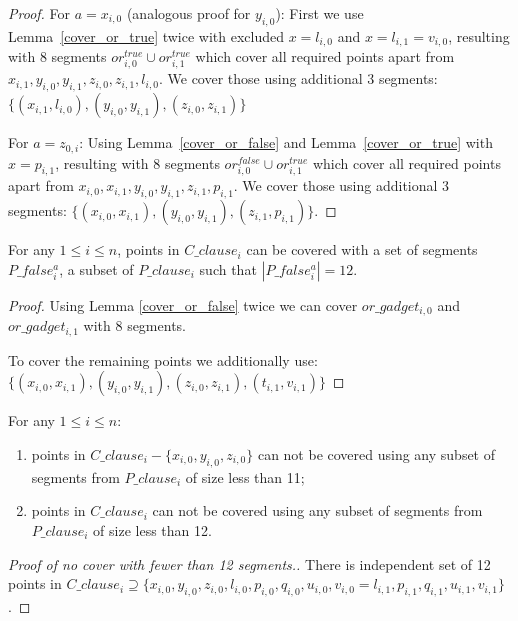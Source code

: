 \begin{proof}
For $a = x_{i, 0}$ (analogous proof for $y_{i, 0}$):
First we use Lemma~\ref{cover_or_true} twice with excluded $x = l_{i, 0}$ and
$x = l_{i, 1} = v_{i, 0}$,
resulting with 8 segments $or^{true}_{i, 0} \cup or^{true}_{i, 1}$
which cover all required points apart from
$x_{i, 1}, y_{i, 0}, y_{i, 1}, z_{i, 0}, z_{i, 1}, l_{i, 0}$.
We cover those using additional 3 segments:
$\{ (x_{i, 1}, l_{i, 0}), (y_{i, 0}, y_{i, 1}),
(z_{i, 0}, z_{i, 1}) \}$

For $a = z_{0, i}$:
Using Lemma~\ref{cover_or_false} and Lemma~\ref{cover_or_true} with
$x = p_{i, 1}$,
resulting with 8 segments $or^{false}_{i, 0} \cup or^{true}_{i, 1}$
which cover all required points apart from
$x_{i, 0}, x_{i, 1}, y_{i, 0}, y_{i, 1}, z_{i, 1}, p_{i, 1}$.
We cover those using additional 3 segments:
$\{ (x_{i, 0}, x_{i, 1}), (y_{i, 0}, y_{i, 1}),
(z_{i, 1}, p_{i, 1}) \}$.
\end{proof}

\begin{lemma}
\label{cover_clauses_solution_false}
For any $1 \le i \le n$,
points in $C\_clause_i$ can be covered with
a set of segments $P\_false^a_i$, a subset of $P\_clause_i$
such that $|P\_false^a_i| = 12$.
\end{lemma}

\begin{proof}
Using Lemma \ref{cover_or_false} twice we can
cover $or\_gadget_{i,0}$ and  $or\_gadget_{i,1}$
with 8 segments.

To cover the remaining points we additionally use:
$\{ (x_{i, 0}, x_{i, 1}), (y_{i, 0}, y_{i, 1}),
(z_{i, 0}, z_{i, 1}), (t_{i, 1}, v_{i, 1}) \}$
\end{proof}

\begin{lemma}
\label{cover_clauses_segments_no_less}
For any $1 \le i \le n$:
\begin{enumerate}[label={(\arabic*)}]
	\item points in $C\_clause_i - \{ x_{i, 0}, y_{i, 0}, z_{i, 0}\}$
	can not be covered using any subset of segments from $P\_clause_i$ of size less than 11;
	\item points in $C\_clause_i$ can not be covered 
	using any subset of segments from $P\_clause_i$ of size less than 12.
\end{enumerate}
\end{lemma}


\begin{proof}[Proof of no cover with fewer than 12 segments.]
There is independent set of 12 points in $C\_clause_i \supseteq
\{ x_{i, 0}, y_{i, 0}, z_{i, 0}, l_{i, 0}, p_{i, 0}, q_{i, 0},
u_{i, 0}, v_{i, 0} = l_{i, 1}, p_{i, 1}, q_{i, 1}, u_{i, 1}, v_{i, 1} \}$.
\end{proof}

